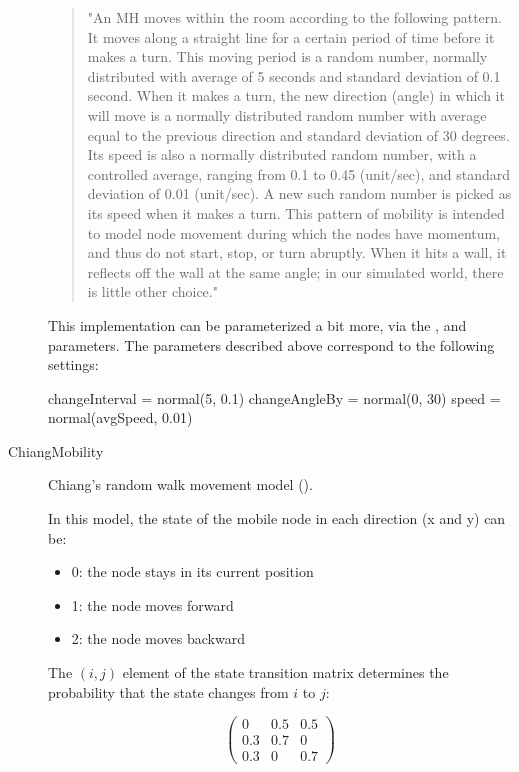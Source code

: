 \begin{description}
\begin{quote}
"An MH moves within the room according to the following pattern. It moves
along a straight line for a certain period of time before it makes a turn.
This moving period is a random number, normally distributed with average of
5 seconds and standard deviation of 0.1 second. When it makes a turn, the
new direction (angle) in which it will move is a normally distributed
random number with average equal to the previous direction and standard
deviation of 30 degrees. Its speed is also a normally distributed random
number, with a controlled average, ranging from 0.1 to 0.45 (unit/sec), and
standard deviation of 0.01 (unit/sec). A new such random number is picked
as its speed when it makes a turn. This pattern of mobility is intended to
model node movement during which the nodes have momentum, and thus do not
start, stop, or turn abruptly. When it hits a wall, it reflects off the
wall at the same angle; in our simulated world, there is little other
choice."
\end{quote}

This implementation can be parameterized a bit more, via the
,  and  parameters.
The parameters described above correspond to the following settings:

\begin{inifile}
changeInterval = normal(5, 0.1)
changeAngleBy = normal(0, 30)
speed = normal(avgSpeed, 0.01)
\end{inifile}

\item[ChiangMobility] Chiang's random walk movement model
(\cite{Chiang98wirelessnetwork}).

In this model, the state of the mobile node in each direction (x and y) can be:

\begin{itemize}
  \item 0: the node stays in its current position
  \item 1: the node moves forward
  \item 2: the node moves backward
\end{itemize}

The $(i,j)$ element of the state transition matrix determines the
probability that the state changes from $i$ to $j$:

$$ \left(
\begin{array}{ccc}
  0 & 0.5 & 0.5 \\
  0.3 & 0.7 & 0 \\
  0.3 & 0 & 0.7
\end{array}
\right) $$


\end{description}
